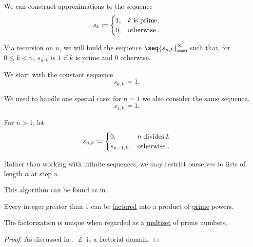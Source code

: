 \begin{algorithm}\label{alg:sieve_of_eratosthenes}
  We can construct approximations to the sequence
  \begin{equation*}
    s_k \coloneqq \begin{cases}
      1, &k \T{is prime}, \\
      0, &\T{otherwise}.
    \end{cases}
  \end{equation*}

  Via recursion on \( n \), we will build the sequence \( \seq{ s_{n,k} }_{k=0}^\infty \) such that, for \( 0 \leq k < n \), \( s_{n,k} \) is \( 1 \) if \( k \) is prime and \( 0 \) otherwise.

  \begin{thmenum}
     We start with the constant sequence
    \begin{equation*}
      s_{0,k} \coloneqq 1.
    \end{equation*}

     We need to handle one special case: for \( n = 1 \) we also consider the same sequence.
    \begin{equation*}
      s_{1,k} \coloneqq 1.
    \end{equation*}

     For \( n > 1 \), let
    \begin{equation*}
      s_{n,k} \coloneqq \begin{cases}
        0,         &n \T{divides} k \\
        s_{n-1,k}, &\T{otherwise}.
      \end{cases}
    \end{equation*}
  \end{thmenum}
\end{algorithm}
\begin{comments}
  \item Rather than working with infinite sequences, we may restrict ourselves to lists of length \( n \) at step \( n \).
  \item This algorithm can be found as  in \cite{notebook:code}.
\end{comments}

\begin{theorem}\label{thm:fundamental_theorem_of_arithmetic}
  Every integer greater than \( 1 \) can be \hyperref[def:irreducible_factorization]{factored} into a product of \hyperref[def:prime_number]{prime} powers.
\end{theorem}
\begin{comments}
  \item The factorization is unique when regarded as a \hyperref[def:multiset]{multiset} of prime numbers.
\end{comments}
\begin{proof}
  As discussed in , \( \BbbZ \) is a factorial domain.
\end{proof}

